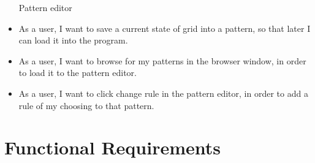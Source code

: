 \documentclass{article}
\begin{document}
\begin{itemize}
		Pattern editor
	\item 
		As a user,
		I want to save a current state of grid into a pattern,
		so that later I can load it into the program.

	\item 
		As a user,
		I want to browse for my patterns in the browser window,
		in order to load it to the pattern editor.

	\item 
		As a user,
		I want to click change rule in the pattern editor,
		in order to add a rule of my choosing to that pattern.
		
\end{itemize}


\section{Functional Requirements}
\end{document}
